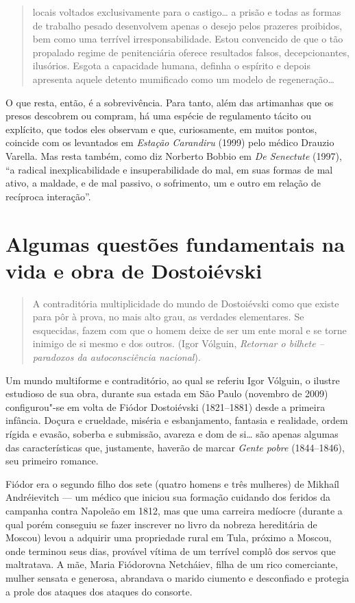 \begin{quote}
locais voltados exclusivamente para o castigo\ldots{} a prisão e todas
as formas de trabalho pesado desenvolvem apenas o desejo pelos prazeres
proibidos, bem como uma terrível irresponsabilidade. Estou convencido de
que o tão propalado regime de penitenciária oferece resultados falsos,
decepcionantes, ilusórios. Esgota a capacidade humana, definha o espírito
e depois apresenta aquele detento mumificado como um modelo de
regeneração\ldots{}
\end{quote}

O que resta, então, é a sobrevivência. Para tanto, além das artimanhas
que os presos descobrem ou compram, há uma espécie de regulamento tácito
ou explícito, que todos eles observam e que, curiosamente, em muitos pontos, coincide com
os levantados em \emph{Estação Carandiru} (1999) pelo médico Drauzio
Varella. Mas resta também, como diz Norberto Bobbio em \emph{De
Senectute} (1997), ``a radical inexplicabilidade e insuperabilidade do
mal, em suas formas de mal ativo, a maldade, e de mal passivo, o
sofrimento, um e outro em relação de recíproca interação''.

\chapter{Algumas questões fundamentais na vida e obra de Dostoiévski}

\begin{quote}
A contraditória multiplicidade do mundo de Dostoiévski como
que existe para pôr à prova, no mais alto grau, as verdades elementares.
Se esquecidas, fazem com que o homem deixe de ser um ente moral e se
torne inimigo de si mesmo e dos outros. (Igor Vólguin, \emph{Retornar o bilhete -- paradoxos da autoconsciência
nacional}).
\end{quote}


Um mundo multiforme e contraditório, ao qual se referiu Igor Vólguin,
o ilustre estudioso de sua obra, durante sua estada em São Paulo
(novembro de 2009) configurou"-se em volta de Fiódor Dostoiévski
(1821--1881) desde a primeira infância. Doçura e crueldade, miséria e
esbanjamento, fantasia e realidade, ordem rígida e evasão, soberba e
submissão, avareza e dom de si\ldots{} são apenas algumas das características
que, justamente, haverão de marcar \emph{Gente pobre} (1844--1846), seu
primeiro romance.

Fiódor era o segundo filho dos sete (quatro homens e três mulheres) de
Mikhaíl Andréievitch --- um médico que iniciou sua formação cuidando dos
feridos da campanha contra Napoleão em 1812, mas que uma carreira
medíocre (durante a qual porém conseguiu se fazer inscrever no livro da
nobreza hereditária de Moscou) levou a adquirir uma propriedade rural em
Tula, próximo a Moscou, onde terminou seus dias, provável vítima de um terrível
complô dos servos que maltratava. A mãe, Maria Fiódorovna Netcháiev,
filha de um rico comerciante, mulher sensata e generosa, abrandava o
marido ciumento e desconfiado e protegia a prole dos ataques dos ataques do
consorte.

